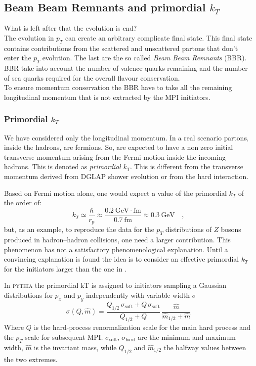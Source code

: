 \subsection{Beam Beam Remnants and primordial $k_T$}
\label{sec:Beam Beam Remnants and primordial kT}

What is left after that the evolution is end?
\\
The evolution in $p_T$ can create an arbitrary complicate final state. 
This final state contains contributions from the scattered and unscattered partons that don't enter the $p_T$ evolution. The last are the so called \textit{Beam Beam Remnants} (BBR). 
BBR take into account the number of valence quarks remaining and the number of sea quarks required for the overall flavour conservation.
\\
To ensure momentum conservation the BBR have to take all the remaining longitudinal momentum that is not extracted by the MPI initiators.

\subsubsection*{Primordial $k_T$}

We have considered only the longitudinal momentum. In a real scenario partons, inside the hadrons, are fermions. So, are expected to have a non zero initial transverse momentum arising from the Fermi motion inside the incoming hadrons. This is denoted as \textit{primordial $k_T$}. This is different from the transverse momentum derived from DGLAP shower evolution or from the hard interaction.

\bigskip

\noindent Based on Fermi motion alone, one would expect a value of the primordial $k_T$ of the order of: 
\begin{equation}
	k_T\simeq\frac{\hbar}{r_p}\approx\frac{0.2\ \mathrm{GeV\cdot fm}}{0.7\ \mathrm{fm}}\approx0.3\ \mathrm{GeV}\quad,
\label{eq:PrimordialKT}
\end{equation}
but, as an example, to reproduce the data for the $p_T$ distributions of $Z$ bosons produced in hadron–hadron collisions, one need a larger contribution. This phenomenon has not a satisfactory phenomenological explanation. Until a convincing explanation is found the idea is to consider an effective primordial $k_T$ for the initiators larger than the one in .

\medskip

In \textsc{pythia} the primordial kT is assigned to initiators sampling a Gaussian distributions for $p_x$ and $p_y$ independently with variable width $\sigma$
\begin{equation}
	\sigma(Q,\widehat{m})=\frac{Q_{1/2}\,\sigma_{\text{soft}}+Q\,\sigma_{\text{soft}}}{Q_{1/2}+Q}\,\frac{\widehat{m}}{\widehat{m}_{1/2}+\widehat{m}}
\end{equation}
Where $Q$ is the hard-process renormalization scale for the main hard process and the $p_T$ scale for subsequent MPI. $\sigma_{\text{soft}}$, $\sigma_{\text{hard}}$ are the minimum and maximum width, $\widehat{m}$ is the invariant mass, while $Q_{1/2}$ and $\widehat{m}_{1/2}$ the halfway values between the two extremes.


